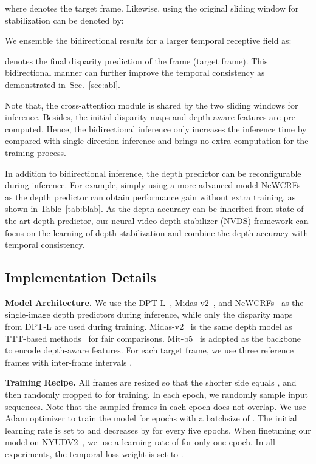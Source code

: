 \documentclass[10pt,twocolumn,letterpaper]{article}
\def\sx{NVDS}
\def\sota{state-of-the-art}
\def\reftab{Table}
\def\refsec{Sec.}
\begin{document}
where  denotes the target frame. Likewise, using the original sliding window for stabilization can be denoted by:

We ensemble the bidirectional results for a larger temporal receptive field as:

 denotes the final disparity prediction of the  frame (target frame). This bidirectional manner can further improve the temporal consistency as demonstrated in~\refsec{}~\ref{sec:abl}.



Note that, the cross-attention module is shared by the two sliding windows for inference. Besides, the initial disparity maps and depth-aware features are pre-computed. Hence, the bidirectional inference only increases the inference time by  compared with single-direction inference and brings no extra computation for the training process. 

In addition to bidirectional inference, the depth predictor can be reconfigurable during inference. For example, simply using a more advanced model NeWCRFs~\cite{newcrfs} as the depth predictor can obtain performance gain without extra training, as shown in \reftab{}~\ref{tab:blab}. As the depth accuracy can be inherited from \sota{} depth predictor, our neural video depth stabilizer (\sx{}) framework can focus on the learning of depth stabilization and combine the depth accuracy with temporal consistency. 


\subsection{Implementation Details}

\noindent \textbf{Model Architecture.} We use the DPT-L~\cite{dpt}, Midas-v2~\cite{midas}, and NeWCRFs~\cite{newcrfs} as the single-image depth predictors during inference, while only the disparity maps from DPT-L are used during training. Midas-v2~\cite{midas} is the same depth model as TTT-based methods~\cite{CVD,rcvd,dycvd} for fair comparisons. Mit-b5~\cite{segformer} is adopted as the backbone to encode depth-aware features. For each target frame, we use three reference frames with inter-frame intervals .

\noindent \textbf{Training Recipe.} All frames are resized so that the shorter side equals , and then randomly cropped to  for training. In each epoch, we randomly sample  input sequences. Note that the sampled frames in each epoch does not overlap. We use Adam optimizer to train the model for  epochs with a batchsize of . The initial learning rate is set to  and decreases by  for every five epochs. When finetuning our model on NYUDV2~\cite{nyu}, we use a learning rate of  for only one epoch. In all experiments, the temporal loss weight  is set to . 
\end{document}
